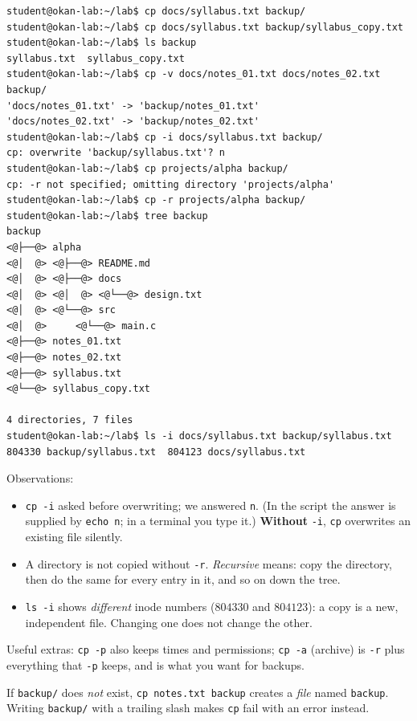 \documentclass[11pt,a4paper]{article}
\newcommand{\cmd}[1]{\texttt{#1}}
\begin{document}
\begin{lstlisting}[style=term]
student@okan-lab:~/lab$ cp docs/syllabus.txt backup/
student@okan-lab:~/lab$ cp docs/syllabus.txt backup/syllabus_copy.txt
student@okan-lab:~/lab$ ls backup
syllabus.txt  syllabus_copy.txt
student@okan-lab:~/lab$ cp -v docs/notes_01.txt docs/notes_02.txt backup/
'docs/notes_01.txt' -> 'backup/notes_01.txt'
'docs/notes_02.txt' -> 'backup/notes_02.txt'
student@okan-lab:~/lab$ cp -i docs/syllabus.txt backup/
cp: overwrite 'backup/syllabus.txt'? n
student@okan-lab:~/lab$ cp projects/alpha backup/
cp: -r not specified; omitting directory 'projects/alpha'
student@okan-lab:~/lab$ cp -r projects/alpha backup/
student@okan-lab:~/lab$ tree backup
backup
<@├──@> alpha
<@│  @> <@├──@> README.md
<@│  @> <@├──@> docs
<@│  @> <@│  @> <@└──@> design.txt
<@│  @> <@└──@> src
<@│  @>     <@└──@> main.c
<@├──@> notes_01.txt
<@├──@> notes_02.txt
<@├──@> syllabus.txt
<@└──@> syllabus_copy.txt

4 directories, 7 files
student@okan-lab:~/lab$ ls -i docs/syllabus.txt backup/syllabus.txt
804330 backup/syllabus.txt  804123 docs/syllabus.txt
\end{lstlisting}

Observations:
\begin{itemize}
  \item \cmd{cp -i} asked before overwriting; we answered \texttt{n}. (In the script the answer is supplied by \cmd{echo n}; in a terminal you type it.) \textbf{Without} \cmd{-i}, \cmd{cp} overwrites an existing file silently.
  \item A directory is not copied without \cmd{-r}. \emph{Recursive} means: copy the directory, then do the same for every entry in it, and so on down the tree.
  \item \cmd{ls -i} shows \emph{different} inode numbers ($804330$ and $804123$): a copy is a new, independent file. Changing one does not change the other.
\end{itemize}
Useful extras: \cmd{cp -p} also keeps times and permissions; \cmd{cp -a} (archive) is \cmd{-r} plus everything that \cmd{-p} keeps, and is what you want for backups.

\begin{tryit}
If \texttt{backup/} does \emph{not} exist, \cmd{cp notes.txt backup} creates a \emph{file} named \texttt{backup}. Writing \texttt{backup/} with a trailing slash makes \cmd{cp} fail with an error instead.
\end{tryit}
\end{document}
